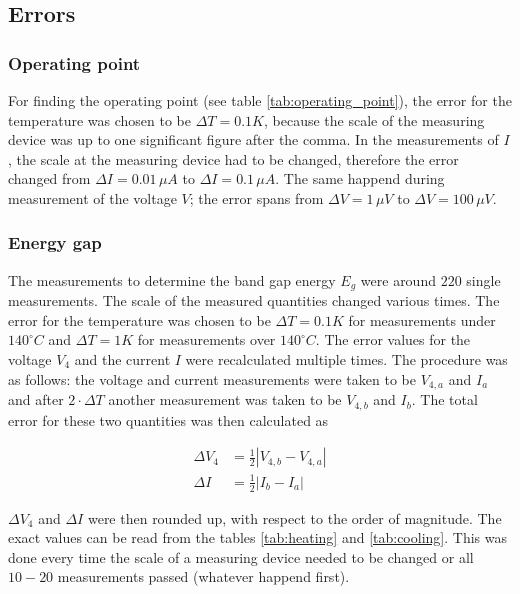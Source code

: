 \documentclass[a4paper]{article}
\begin{document}
\subsection{Errors}

\subsubsection{Operating point}

For finding the operating point (see table \ref{tab:operating_point}), the error for the temperature was chosen to be $\Delta T = 0.1 K$, because the scale of the measuring device was up to one significant figure after the comma. In the measurements of $I$, the scale at the measuring device had to be changed, therefore the error changed from $\Delta I = 0.01 \, \mu A$ to $\Delta I = 0.1 \, \mu A$. The same happend during measurement of the voltage $V$; the error spans from $\Delta V = 1 \, \mu V$ to $\Delta V = 100 \, \mu V$.

\subsubsection{Energy gap}

The measurements to determine the band gap energy $E_g$ were around $220$ single measurements. The scale of the measured quantities changed various times. The error for the temperature was chosen to be $\Delta T = 0.1 K$ for measurements under $140^{\circ}C$ and $\Delta T = 1 K$ for measurements over $140^{\circ}C$. The error values for the voltage $V_4$ and the current $I$ were recalculated multiple times. The procedure was as follows: the voltage and current measurements were taken to be $V_{4,a}$ and $I_a$ and after $2 \cdot \Delta T$ another measurement was taken to be $V_{4,b}$ and $I_b$. The total error for these two quantities was then calculated as

\begin{subequations}
\begin{align}
\Delta V_4 &= \frac{1}{2} | V_{4,b} - V_{4,a} | \\
\Delta I &= \frac{1}{2} | I_b - I_a |
\end{align}
\end{subequations}

$\Delta V_4$ and $\Delta I$ were then rounded up, with respect to the order of magnitude. The exact values can be read from the tables \ref{tab:heating} and \ref{tab:cooling}. This was done every time the scale of a measuring device needed to be changed or all $10-20$ measurements passed (whatever happend first).
\end{document}
